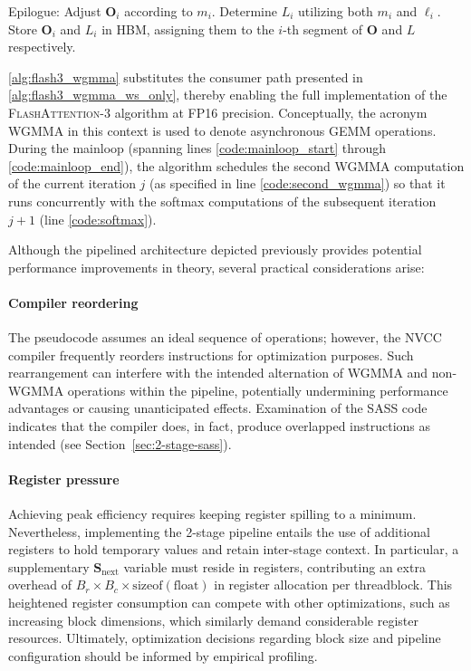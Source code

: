 \begin{enumerate}
\begin{algorithm}[H]
\begin{algorithmic}[1]
\STATE Epilogue: Adjust $\mathbf{O}_{i}$ according to $m_{i}$. Determine $L_{i}$ utilizing both $m_{i}$ and $\ell_{i}$.
      Store $\mathbf{O}_{i}$ and $L_{i}$ in HBM, assigning them to the $i$-th segment of $\mathbf{O}$ and $L$ respectively.
    \end{algorithmic}
  \end{algorithm}

\cref{alg:flash3_wgmma} substitutes the consumer path presented in \cref{alg:flash3_wgmma_ws_only}, thereby enabling the full implementation of the \textsc{FlashAttention-3} algorithm at FP16 precision. Conceptually, the acronym WGMMA in this context is used to denote asynchronous GEMM operations. During the mainloop (spanning lines \ref{code:mainloop_start} through \ref{code:mainloop_end}), the algorithm schedules the second WGMMA computation of the current iteration $j$ (as specified in line \ref{code:second_wgmma}) so that it runs concurrently with the softmax computations of the subsequent iteration $j+1$ (line \ref{code:softmax}).

Although the pipelined architecture depicted previously provides potential performance improvements in theory, several practical considerations arise:
\paragraph{Compiler reordering} The pseudocode assumes an ideal sequence of operations; however, the NVCC compiler frequently reorders instructions for optimization purposes. Such rearrangement can interfere with the intended alternation of WGMMA and non-WGMMA operations within the pipeline, potentially undermining performance advantages or causing unanticipated effects. Examination of the SASS code indicates that the compiler does, in fact, produce overlapped instructions as intended (see Section~\ref{sec:2-stage-sass}).
\paragraph{Register pressure} Achieving peak efficiency requires keeping register spilling to a minimum. Nevertheless, implementing the 2-stage pipeline entails the use of additional registers to hold temporary values and retain inter-stage context. In particular, a supplementary $\mathbf{S}_{\mathrm{next}}$ variable must reside in registers, contributing an extra overhead of $B_r \times B_c \times \text{sizeof}(\text{float})$ in register allocation per threadblock. This heightened register consumption can compete with other optimizations, such as increasing block dimensions, which similarly demand considerable register resources. Ultimately, optimization decisions regarding block size and pipeline configuration should be informed by empirical profiling.

\end{enumerate}

